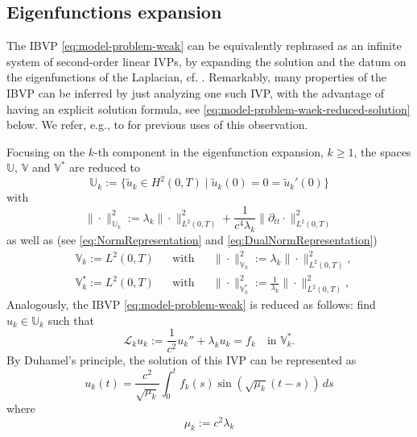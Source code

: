 \documentclass{amsart}
\theoremstyle{plain}
\theoremstyle{remark}
\numberwithin{equation}{section}
\numberwithin{theorem}{section}
\newcommand{\trial}{\mathbb{U}}
\newcommand{\test}{\mathbb{V}}
\newcommand{\data}{\mathbb{V}^*}
\begin{document}
\subsection{Eigenfunctions expansion}
\label{SS:EigenfunctionsExpansion}
The IBVP \eqref{eq:model-problem-weak} can be equivalently rephrased as an infinite system of second-order linear IVPs, by expanding the solution and the datum on the eigenfunctions of the Laplacian, cf. \cite[Chapter XV]{Dautray.Lions:92}. Remarkably, many properties of the IBVP can be inferred by just analyzing one such IVP, with the advantage of having an explicit solution formula, see \eqref{eq:model-problem-waek-reduced-solution} below. We refer, e.g., to \cite{Zank:20, Steinbach.Zank:22, Hoonhout.Loscher.UrzuaTorres:25} for previous uses of this observation.

Focusing on the $k$-th component in the eigenfunction expansion, $k \geq 1$, the spaces $\trial$, $\test$ and $\data$ are reduced to 
\begin{equation*}
\trial_k := \{ \widetilde u_k \in H^2(0,T) \mid \widetilde u_k(0) = 0 = \widetilde u_k'(0) \} 	
\end{equation*}
with
\begin{equation}
	\label{eq:norm-trial-exp}
\|\cdot\|^2_{\trial_k} := \lambda_k \|\cdot\|^2_{L^2(0,T)} + \frac{1}{c^4 \lambda_k} \|\partial_{tt} \cdot\|^2_{L^2(0,T)}
\end{equation}
as well as (see \eqref{eq:NormRepresentation} and \eqref{eq:DualNormRepresentation})
\begin{equation}
	\label{eq:spaces-expanded}
	\begin{aligned}
		&\test_k := L^2(0,T) && \text{with} && \|\cdot\|^2_{\test_k} := \lambda_k \|\cdot\|^2_{L^2(0,T)},\\
		&\data_k := L^2(0,T) && \text{with} && \|\cdot\|^2_{\data_k} := \frac{1}{\lambda_k} \|\cdot\|^2_{L^2(0,T)},
	\end{aligned}
\end{equation}
Analogously, the IBVP \eqref{eq:model-problem-weak} is reduced as follows: find $u_k \in \trial_k$ such that 
\begin{equation}
	\label{eq:model-problem-weak-reduced}
	\mathcal{L}_k u_k := \frac{1}{c^2}u_k'' +\lambda_k u_k = f_k \quad \text{in $\data_k$}.
\end{equation}
By Duhamel's principle, the solution of this IVP can be represented as
\begin{equation}
	\label{eq:model-problem-waek-reduced-solution}
	u_k(t) = \frac{c^2}{\sqrt{\mu_k}}\int_0^t f_k(s) \sin{(\sqrt{\mu_k}(t-s))}\,ds
\end{equation}
where
\begin{equation}
\label{eq:mu-k}
	\mu_k := c^2 \lambda_k
\end{equation}
\end{document}
